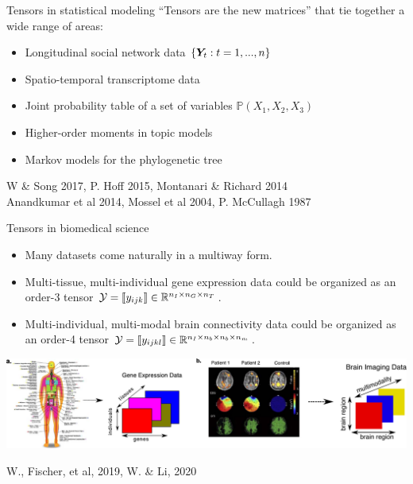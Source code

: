 \documentclass[10pt, mathserif]{beamer} %
\theoremstyle{definition}
\theoremstyle{plain}
\begin{document}
\begin{frame}{Tensors in statistical modeling}
``Tensors are the new matrices'' that tie together a wide range of areas:
\bigskip
\begin{itemize}
\item Longitudinal social network data $\{\bm Y_t: t=1,...,n\}$
\item Spatio-temporal transcriptome data
\item Joint probability table of a set of variables $\mathbb{P}(X_1,X_2,X_3)$
\item Higher-order moments in topic models
\item Markov models for the phylogenetic tree
\end{itemize}
\bigskip
\hfill {\scriptsize W \& Song 2017, P. Hoff 2015, Montanari \& Richard 2014}\\
\hfill{\scriptsize  Anandkumar et al 2014, Mossel et al 2004, P. McCullagh 1987}
\end{frame}



\begin{frame}{Tensors in biomedical science}

\begin{itemize}
\item Many datasets come naturally in a multiway form.
\item Multi-tissue, multi-individual gene expression data could be organized as an order-3 tensor $\mathcal{Y}=\llbracket y_{ijk} \rrbracket\in \mathbb{R}^{n_I\times n_G\times n_T}$.
\item Multi-individual, multi-modal brain connectivity data could be organized as an order-4 tensor $\mathcal{Y}=\llbracket y_{ijkl} \rrbracket\in \mathbb{R}^{n_I\times n_b\times n_b \times n_m}$.
\end{itemize}
\bigskip
\centerline{\includegraphics[width=\textwidth]{Figures/example.pdf}}
\bigskip
\hfill {\scriptsize W., Fischer, et al, 2019, W. \& Li, 2020}\\
\end{frame}
\end{document}
